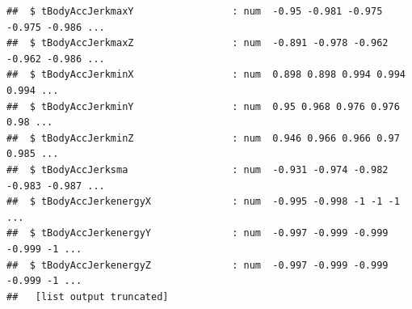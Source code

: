 \documentclass[
]{article}
\newenvironment{Shaded}{\begin{snugshade}}{\end{snugshade}}
\newcommand{\AttributeTok}[1]{\textcolor[rgb]{0.13,0.29,0.53}{#1}}
\newcommand{\ControlFlowTok}[1]{\textcolor[rgb]{0.13,0.29,0.53}{\textbf{#1}}}
\newcommand{\DecValTok}[1]{\textcolor[rgb]{0.00,0.00,0.81}{#1}}
\newcommand{\FloatTok}[1]{\textcolor[rgb]{0.00,0.00,0.81}{#1}}
\newcommand{\FunctionTok}[1]{\textcolor[rgb]{0.13,0.29,0.53}{\textbf{#1}}}
\newcommand{\NormalTok}[1]{#1}
\newcommand{\OtherTok}[1]{\textcolor[rgb]{0.56,0.35,0.01}{#1}}
\newcommand{\SpecialCharTok}[1]{\textcolor[rgb]{0.81,0.36,0.00}{\textbf{#1}}}
\newcommand{\StringTok}[1]{\textcolor[rgb]{0.31,0.60,0.02}{#1}}
\begin{document}
\begin{verbatim}
##  $ tBodyAccJerkmaxY                 : num  -0.95 -0.981 -0.975 -0.975 -0.986 ...
##  $ tBodyAccJerkmaxZ                 : num  -0.891 -0.978 -0.962 -0.962 -0.986 ...
##  $ tBodyAccJerkminX                 : num  0.898 0.898 0.994 0.994 0.994 ...
##  $ tBodyAccJerkminY                 : num  0.95 0.968 0.976 0.976 0.98 ...
##  $ tBodyAccJerkminZ                 : num  0.946 0.966 0.966 0.97 0.985 ...
##  $ tBodyAccJerksma                  : num  -0.931 -0.974 -0.982 -0.983 -0.987 ...
##  $ tBodyAccJerkenergyX              : num  -0.995 -0.998 -1 -1 -1 ...
##  $ tBodyAccJerkenergyY              : num  -0.997 -0.999 -0.999 -0.999 -1 ...
##  $ tBodyAccJerkenergyZ              : num  -0.997 -0.999 -0.999 -0.999 -1 ...
##   [list output truncated]
\end{verbatim}

\begin{Shaded}
\end{Shaded}
\end{document}

